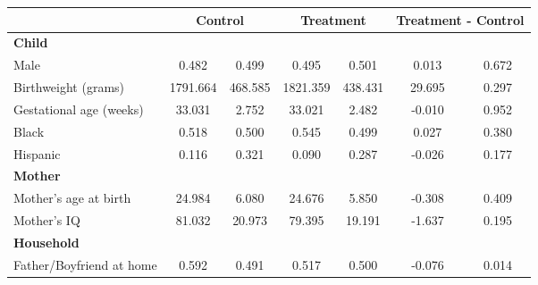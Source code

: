 \begin{tabular}{lcccccc}
\toprule
& \multicolumn{2}{c}{Control} & \multicolumn{2}{c}{Treatment} & \multicolumn{2}{c}{Treatment - Control} \\
\midrule
\textbf{Child} & & & & & & \\
\quad\quad Male & 0.482 & 0.499 & 0.495 & 0.501 & 0.013 & 0.672 \\
\quad\quad Birthweight (grams) & 1791.664 & 468.585 & 1821.359 & 438.431 & 29.695 & 0.297 \\
\quad\quad Gestational age (weeks) & 33.031 & 2.752 & 33.021 & 2.482 & -0.010 & 0.952 \\
\quad\quad Black & 0.518 & 0.500 & 0.545 & 0.499 & 0.027 & 0.380 \\
\quad\quad Hispanic & 0.116 & 0.321 & 0.090 & 0.287 & -0.026 & 0.177 \\
\textbf{Mother} & & & & & & \\
\quad\quad Mother's age at birth & 24.984 & 6.080 & 24.676 & 5.850 & -0.308 & 0.409 \\
\quad\quad Mother's IQ & 81.032 & 20.973 & 79.395 & 19.191 & -1.637 & 0.195 \\
\textbf{Household} & & & & & & \\
\quad\quad Father/Boyfriend at home & 0.592 & 0.491 & 0.517 & 0.500 & -0.076 & 0.014 \\
\bottomrule
\end{tabular}
